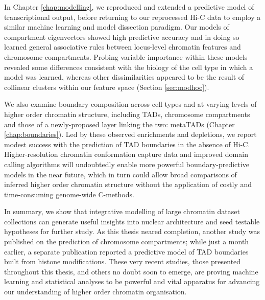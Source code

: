 \documentclass[a4paper,11pt,oneside]{book}
\begin{document}
In Chapter \ref{chap:modelling}, we reproduced and extended a predictive model of transcriptional output, before returning to our reprocessed Hi-C data to employ a similar machine learning and model dissection paradigm.
Our models of compartment eigenvectors showed high predictive accuracy and in doing so learned general associative rules between locus-level chromatin features and chromosome compartments. Probing variable importance within these models revealed some differences consistent with the biology of the cell type in which a model was learned, whereas other dissimilarities appeared to be the result of collinear clusters within our feature space (Section \ref{sec:modhoc}).

We also examine boundary composition across cell types and at varying levels of higher order chromatin structure, including TADs, chromosome compartments and those of a newly-proposed layer linking the two: metaTADs (Chapter \ref{chap:boundaries}). Led by these observed enrichments and depletions, we report modest success with the prediction of TAD boundaries in the absence of Hi-C. Higher-resolution chromatin conformation capture data and improved domain calling algorithms will undoubtedly enable more powerful boundary-predictive models in the near future, which in turn could allow broad comparisons of inferred higher order chromatin structure without the application of costly and time-consuming genome-wide C-methods.

In summary, we show that integrative modelling of large chromatin dataset
collections can generate useful insights into nuclear architecture and seed testable hypotheses for further study. As this thesis neared completion, another study was published on the prediction of chromosome compartments;\cite{Fortin2015} while just a month earlier, a separate publication reported a predictive model of TAD boundaries built from histone modifications.\cite{Huang2015} These very recent studies, those presented throughout this thesis, and others no doubt soon to emerge, are proving machine learning and statistical analyses to be powerful and vital apparatus for advancing our understanding of higher order chromatin organisation.

\ifstandalone
\begin{small}

\end{small}
\fi
\end{document}
